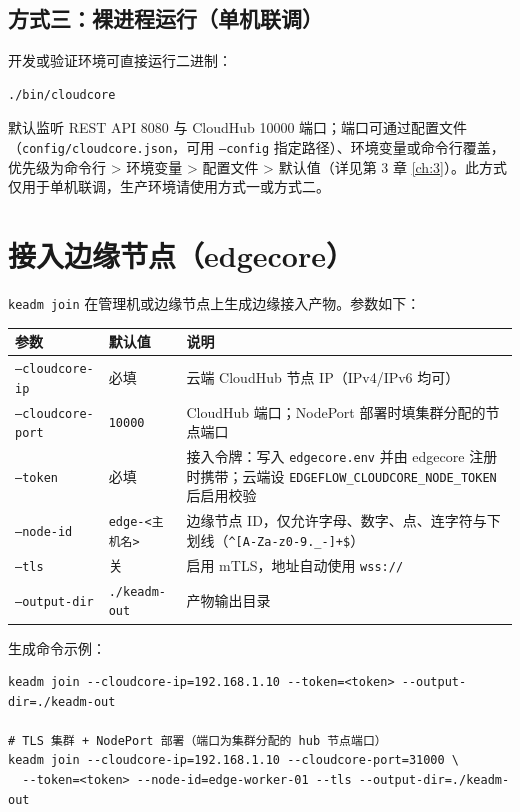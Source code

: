 \subsection{方式三：裸进程运行（单机联调）}

开发或验证环境可直接运行二进制：

\begin{lstlisting}
./bin/cloudcore
\end{lstlisting}

默认监听 REST API 8080 与 CloudHub 10000 端口；端口可通过配置文件（\texttt{config/cloudcore.json}，可用 \texttt{--config} 指定路径）、环境变量或命令行覆盖，优先级为命令行 > 环境变量 > 配置文件 > 默认值（详见第 3 章 \autoref{ch:3}）。此方式仅用于单机联调，生产环境请使用方式一或方式二。

\section{接入边缘节点（edgecore）}

\texttt{keadm join} 在管理机或边缘节点上生成边缘接入产物。参数如下：

\begin{tabularx}{\textwidth}{|l|l|X|}
  \hline
  \textbf{参数} & \textbf{默认值} & \textbf{说明} \\
  \hline
  \texttt{--cloudcore-ip} & 必填 & 云端 CloudHub 节点 IP（IPv4/IPv6 均可） \\
  \hline
  \texttt{--cloudcore-port} & \texttt{10000} & CloudHub 端口；NodePort 部署时填集群分配的节点端口 \\
  \hline
  \texttt{--token} & 必填 & 接入令牌：写入 \texttt{edgecore.env} 并由 edgecore 注册时携带；云端设 \texttt{EDGEFLOW\_CLOUDCORE\_NODE\_TOKEN} 后启用校验 \\
  \hline
  \texttt{--node-id} & \texttt{edge-<主机名>} & 边缘节点 ID，仅允许字母、数字、点、连字符与下划线（\texttt{\textasciicircum{}[A-Za-z0-9.\_-]+\$}） \\
  \hline
  \texttt{--tls} & 关 & 启用 mTLS，地址自动使用 \texttt{wss://} \\
  \hline
  \texttt{--output-dir} & \texttt{./keadm-out} & 产物输出目录 \\
  \hline
\end{tabularx}

生成命令示例：

\begin{lstlisting}
keadm join --cloudcore-ip=192.168.1.10 --token=<token> --output-dir=./keadm-out

# TLS 集群 + NodePort 部署（端口为集群分配的 hub 节点端口）
keadm join --cloudcore-ip=192.168.1.10 --cloudcore-port=31000 \
  --token=<token> --node-id=edge-worker-01 --tls --output-dir=./keadm-out
\end{lstlisting}

